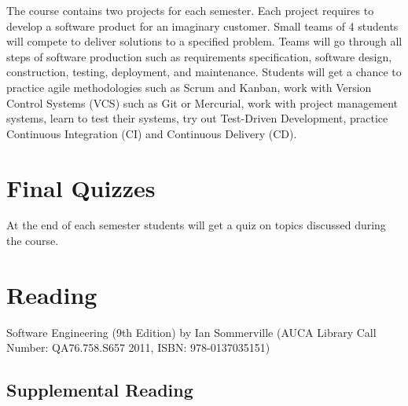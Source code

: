 \documentclass[12pt,a4paper,oneside]{article}
\begin{document}
        The course contains two projects for each semester. Each project
        requires to develop a software product for an imaginary customer. Small
        teams of 4 students will compete to deliver solutions to a specified
        problem. Teams will go through all steps of software production such as
        requirements specification, software design, construction, testing,
        deployment, and maintenance. Students will get a chance to practice
        agile methodologies such as Scrum and Kanban, work with Version Control
        Systems (VCS) such as Git or Mercurial, work with project management
        systems, learn to test their systems, try out Test-Driven Development,
        practice Continuous Integration (CI) and Continuous Delivery (CD).

    \section{Final Quizzes}

        At the end of each semester students will get a quiz on topics discussed
        during the course.

    \section{Reading}

        Software Engineering (9th Edition) by Ian Sommerville (AUCA Library Call
        Number: QA76.758.S657 2011, ISBN: 978-0137035151)

        \subsection{Supplemental Reading}
\end{document}
